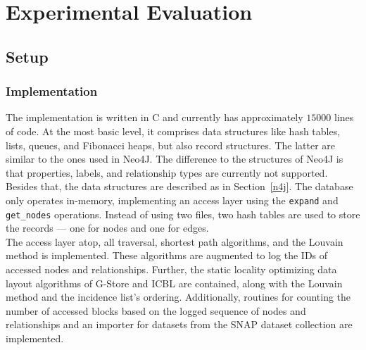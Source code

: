 \chapter{Experimental Evaluation}\label{\positionnumber} 
\section{Setup}\label{\positionnumber}
    \subsection*{Implementation}
        The implementation is written in C and currently has approximately $15 000$ lines of code.
        At the most basic level, it comprises data structures like hash tables, lists, queues, and Fibonacci heaps, but also record structures. 
        The latter are similar to the ones used in Neo4J. 
        The difference to the structures of Neo4J is that properties, labels, and relationship types are currently not supported.
        Besides that, the data structures are described as in Section~\ref{n4j}.
        The database only operates in-memory, implementing an access layer using the \texttt{expand} and \texttt{get_nodes} operations.
        Instead of using two files, two hash tables are used to store the records --- one for nodes and one for edges. \\
        The access layer atop, all traversal, shortest path algorithms, and the Louvain method is implemented. These algorithms are augmented to log the IDs of accessed nodes and relationships.
        Further, the static locality optimizing data layout algorithms of G-Store and ICBL are contained, along with the Louvain method and the incidence list's ordering.
        Additionally, routines for counting the number of accessed blocks based on the logged sequence of nodes and relationships and an importer for datasets from the SNAP dataset collection are implemented.
    
    
